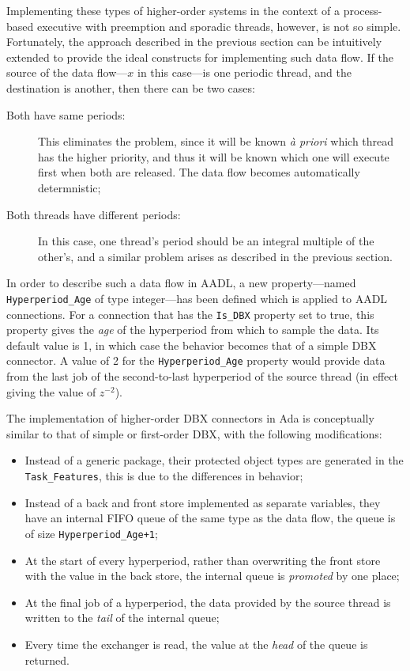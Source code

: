 Implementing these types of higher-order systems in the context of a
process-based executive with preemption and sporadic threads, however,
is not so simple. Fortunately, the approach described in the previous
section can be intuitively extended to provide the ideal constructs
for implementing such data flow. If the source of the data flow---$x$
in this case---is one periodic thread, and the destination is another,
then there can be two cases:

\begin{description}
\item[Both have same periods:]{This eliminates the problem, since it
  will be known \emph{\`a priori} which thread has the higher
  priority, and thus it will be known which one will execute first
  when both are released. The data flow becomes automatically
  determnistic;}
\item[Both threads have different periods:]{In this case, one thread's
  period should be an integral multiple of the other's, and a similar
  problem arises as described in the previous section.}
\end{description}

In order to describe such a data flow in AADL, a new property---named
\texttt{Hyperperiod\_Age} of type integer---has been defined which is
applied to AADL connections. For a connection that has the
\texttt{Is\_DBX} property set to true, this property gives the
\emph{age} of the hyperperiod from which to sample the data. Its
default value is 1, in which case the behavior becomes that of a
simple DBX connector. A value of 2 for the \texttt{Hyperperiod\_Age}
property would provide data from the last job of the second-to-last
hyperperiod of the source thread (in effect giving the value of
$z^{-2}$).

The implementation of higher-order DBX connectors in Ada is
conceptually similar to that of simple or first-order DBX, with the
following modifications:

\begin{itemize}
\item{Instead of a generic package, their protected object types are
  generated in the \texttt{Task\_Features}, this is due to the
  differences in behavior;}
\item{Instead of a back and front store implemented as separate
  variables, they have an internal FIFO queue of the same type as the
  data flow, the queue is of size \texttt{Hyperperiod\_Age+1};}
\item{At the start of every hyperperiod, rather than overwriting the
  front store with the value in the back store, the internal queue is
  \emph{promoted} by one place;}
\item{At the final job of a hyperperiod, the data provided by the
  source thread is written to the \emph{tail} of the internal queue;}
\item{Every time the exchanger is read, the value at the \emph{head}
  of the queue is returned.}
\end{itemize}


